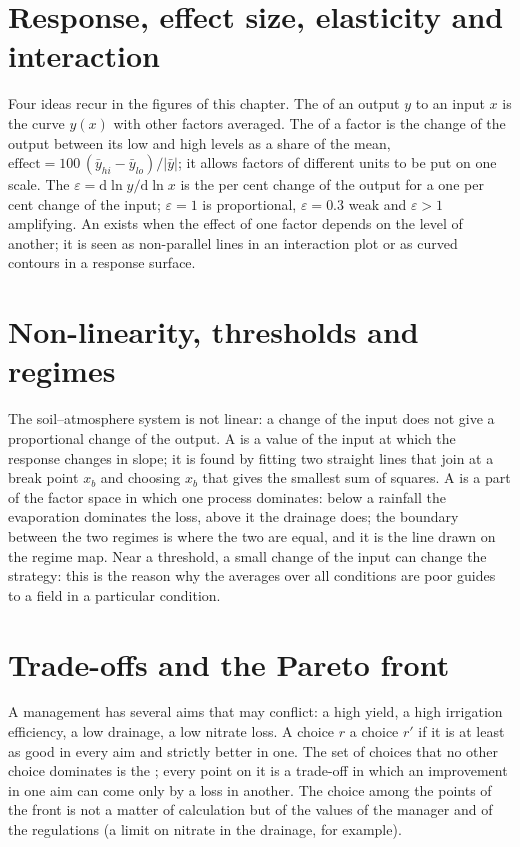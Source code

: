 \section{Response, effect size, elasticity and interaction}
Four ideas recur in the figures of this chapter. The  of an output $y$ to an input $x$ is the curve $y(x)$ with other factors averaged. The  of a factor is the change of the output between its low and high levels as a share of the mean, $\mathrm{effect}=100\,(\bar y_{hi}-\bar y_{lo})/|\bar y|$; it allows factors of different units to be put on one scale. The  $\varepsilon=\mathrm d\ln y/\mathrm d\ln x$ is the per cent change of the output for a one per cent change of the input; $\varepsilon=1$ is proportional, $\varepsilon=0.3$ weak and $\varepsilon>1$ amplifying. An  exists when the effect of one factor depends on the level of another; it is seen as non-parallel lines in an interaction plot or as curved contours in a response surface.

\section{Non-linearity, thresholds and regimes}
The soil--atmosphere system is not linear: a change of the input does not give a proportional change of the output. A  is a value of the input at which the response changes in slope; it is found by fitting two straight lines that join at a break point $x_b$ and choosing $x_b$ that gives the smallest sum of squares. A  is a part of the factor space in which one process dominates: below a rainfall the evaporation dominates the loss, above it the drainage does; the boundary between the two regimes is where the two are equal, and it is the line drawn on the regime map. Near a threshold, a small change of the input can change the strategy: this is the reason why the averages over all conditions are poor guides to a field in a particular condition.

\section{Trade-offs and the Pareto front}
A management has several aims that may conflict: a high yield, a high irrigation efficiency, a low drainage, a low nitrate loss. A choice $r$  a choice $r'$ if it is at least as good in every aim and strictly better in one. The set of choices that no other choice dominates is the ; every point on it is a trade-off in which an improvement in one aim can come only by a loss in another. The choice among the points of the front is not a matter of calculation but of the values of the manager and of the regulations (a limit on nitrate in the drainage, for example).

